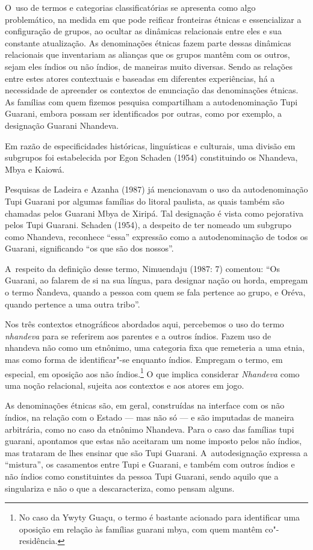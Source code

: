 O~uso de termos e categorias classificatórias se apresenta como algo
problemático, na medida em que pode reificar fronteiras étnicas e
essencializar a configuração de grupos, ao ocultar as dinâmicas
relacionais entre eles e sua constante atualização. As denominações
étnicas fazem parte dessas dinâmicas relacionais que inventariam as
alianças que os grupos mantêm com os outros, sejam eles índios ou não
índios, de maneiras muito diversas. Sendo as relações entre estes
atores contextuais e baseadas em diferentes experiências, há a
necessidade de apreender os contextos de enunciação das denominações
étnicas. As famílias com quem fizemos pesquisa compartilham a
autodenominação Tupi Guarani, embora possam ser identificados por
outras, como por exemplo, a designação Guarani Nhandeva.

Em razão de especificidades históricas, linguísticas e culturais, uma
divisão em subgrupos foi estabelecida por Egon Schaden (1954)
constituindo os Nhandeva, Mbya e Kaiowá.

Pesquisas de Ladeira e Azanha (1987) já mencionavam o uso da
autodenominação Tupi Guarani por algumas famílias do litoral paulista,
as quais também são chamadas pelos Guarani Mbya de Xiripá. Tal
designação é vista como pejorativa pelos Tupi Guarani. Schaden (1954),
a despeito de ter nomeado um subgrupo como Nhandeva, reconhece ``essa''
expressão como a autodenominação de todos os Guarani, significando ``os
que são dos nossos''.

A~respeito da definição desse termo, Nimuendaju (1987: 7) comentou: ``Os
Guarani, ao falarem de si na sua língua, para designar nação ou horda,
empregam o termo Ñandeva, quando a pessoa com quem se fala pertence ao
grupo, e Oréva, quando pertence a uma outra tribo''.

Nos três contextos etnográficos abordados aqui, percebemos o uso do
termo \emph{nhandeva} para se referirem aos parentes e a outros índios. Fazem
uso de nhandeva não como um etnônimo, uma categoria fixa que remeteria
a uma etnia, mas como forma de identificar"-se enquanto índios. Empregam
o termo, em especial, em oposição aos não índios.\footnote{No caso da
Ywyty Guaçu, o termo é bastante acionado para identificar uma oposição
em relação às famílias guarani mbya, com quem mantêm co"-residência.} O
que implica considerar \emph{Nhandeva} como uma noção relacional, sujeita aos
contextos e aos atores em jogo.

As denominações étnicas são, em geral, construídas na interface com os
não índios, na relação com o Estado --- mas não só --- e são imputadas de
maneira arbitrária, como no caso da etnônimo Nhandeva. Para o caso das
famílias tupi guarani, apontamos que estas não aceitaram um nome
imposto pelos não índios, mas trataram de lhes ensinar que são Tupi
Guarani. A~autodesignação expressa a ``mistura'', os casamentos entre Tupi
e Guarani, e também com outros índios e não índios como constituintes
da pessoa Tupi Guarani, sendo aquilo que a singulariza e não o que a
descaracteriza, como pensam alguns.

